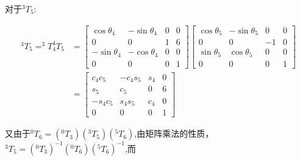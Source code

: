 \documentclass{ctexart}
\begin{document}
对于$^3T_5$:

\begin{equation}
	\begin{aligned}
	^3T_5=^3T_4^4T_5&=\begin{bmatrix}
		\cos\theta_4 & -\sin\theta_4 & 0 & 0 \\
		0 & 0 & 1 & 6 \\
		-\sin\theta_4 & -\cos\theta_4 & 0 & 0 \\
		0 & 0 & 0 & 1
	\end{bmatrix}\begin{bmatrix}
		\cos\theta_5 & -\sin\theta_5 & 0 & 0 \\
		0 & 0 & -1 & 0 \\
		\sin\theta_5 & \cos\theta_5 & 0 & 0 \\
		0 & 0 & 0 & 1
	\end{bmatrix}\\
	&=\begin{bmatrix}
		c_4c_5 & -c_4s_5 & s_4 & 0 \\
		s_5 & c_5 & 0 & 6\\
		-s_4c_5 & s_4s_5 & c_4 & 0 \\
		0 & 0 & 0 & 1
	\end{bmatrix}
	\end{aligned}
\end{equation}

又由于$^0T_6=(^0T_3)(^3T_5)(^5T_6)$,由矩阵乘法的性质，$^3T_5=(^0T_3)^{-1}(^0T_6)(^5T_6)^{-1}$,而
\end{document}
